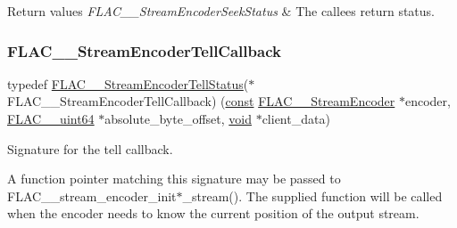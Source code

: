 \begin{DoxyRetVals}{Return values}
{\em F\+L\+A\+C\+\_\+\+\_\+\+Stream\+Encoder\+Seek\+Status} & The callee\textquotesingle{}s return status. \\
\hline
\end{DoxyRetVals}
\mbox{\label{group__flac__stream__encoder_gabefdf2279e1d0347d9f98f46da4e415b}} 
\subsubsection{\texorpdfstring{F\+L\+A\+C\+\_\+\+\_\+\+Stream\+Encoder\+Tell\+Callback}{FLAC\_\_StreamEncoderTellCallback}}
{\footnotesize\ttfamily typedef \hyperlink{group__flac__stream__encoder_gab628f63181250eb977a28bf12b7dd9ff}{F\+L\+A\+C\+\_\+\+\_\+\+Stream\+Encoder\+Tell\+Status}($\ast$ F\+L\+A\+C\+\_\+\+\_\+\+Stream\+Encoder\+Tell\+Callback) (\hyperlink{zconf_8h_a2c212835823e3c54a8ab6d95c652660e}{const} \hyperlink{struct_f_l_a_c_____stream_encoder}{F\+L\+A\+C\+\_\+\+\_\+\+Stream\+Encoder} $\ast$encoder, \hyperlink{ordinals_8h_aa78c8c70a3eb8a58af7436f278acde8e}{F\+L\+A\+C\+\_\+\+\_\+uint64} $\ast$absolute\+\_\+byte\+\_\+offset, \hyperlink{png_8h_ac9c84fa68bbad002983e35ce3663c686}{void} $\ast$client\+\_\+data)}

Signature for the tell callback.

A function pointer matching this signature may be passed to F\+L\+A\+C\+\_\+\+\_\+stream\+\_\+encoder\+\_\+init$\ast$\+\_\+stream(). The supplied function will be called when the encoder needs to know the current position of the output stream.

